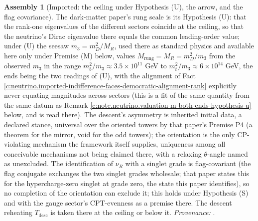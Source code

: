 \documentclass[11pt]{article}
\theoremstyle{definition}
\newtheorem{assembled}[theorem]{Assembly}
\theoremstyle{plain}
\newcommand{\changedmark}[2]{\marginpar{\raggedright\scriptsize\color{#1}#2}}
\begin{document}
\begin{assembled}[Imported: the ceiling under Hypothesis (U), the arrow, and the flag covariance]\label{c:neutrino.imported-ceiling-under-hypothesis-u-arrow}
\changedmark{BrickRed}{corrected since the deposit}
The dark-matter paper's rung scale is its Hypothesis (U): that the rank-one eigenvalues of the different sectors coincide at the ceiling, so that the neutrino's Dirac eigenvalue there equals the common leading-order value; under (U) the seesaw $m_{3} = m_{D}^{2}/M_{R}$, used there as standard physics and available here only under Premise (M) below, values $M_{\mathrm{rung}} = M_{R} = m_{D}^{2}/m_{3}$ from the observed $m_{3}$ in the range $m_{b}^{2}/m_{3} \approx 3.5 \times 10^{11}$ GeV to $m_{t}^{2}/m_{3} \approx 6 \times 10^{14}$ GeV, the ends being the two readings of (U), with the alignment of Fact \ref{c:neutrino.imported-indifference-faces-democratic-alignment-rank} explicitly never equating magnitudes across sectors (this is a fit of the same quantity from the same datum as Remark \ref{c:note.neutrino.valuation-m-both-ends-hypothesis-u} below, and is read there). The descent's asymmetry is inherited initial data, a declared stance, universal over the oriented towers by that paper's Premise P4 (a theorem for the mirror, void for the odd towers); the orientation is the only CP-violating mechanism the framework itself supplies, uniqueness among all conceivable mechanisms not being claimed there, with a relaxing $\theta$-angle named as unexcluded. The identification of $\nu_{R}$ with a singlet grade is flag-covariant (the flag conjugate exchanges the two singlet grades wholesale; that paper states this for the hypercharge-zero singlet at grade zero, the state this paper identifies), so no completion of the orientation can exclude it; this holds under Hypothesis (S) and with the gauge sector's CPT-evenness as a premise there. The descent reheating $T_{\mathrm{desc}}$ is taken there at the ceiling or below it. \emph{Provenance:} \cite[Prop.~6.4, Prop.~5.1, Prop.~5.2, App.~A]{ButlerT14}.
\end{assembled}
\end{document}
